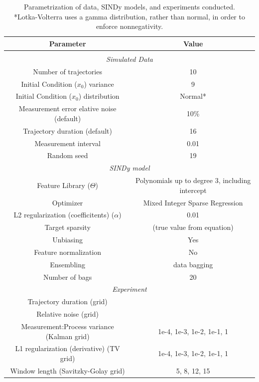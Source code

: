 \documentclass{ACCESS_latex_template_20231118/ieeeaccess}
\begin{document}
\begin{table}
    \label{tab:exp-params}
    \begin{tabular}{c c}
        Parameter & Value\\
        \hline \\
        \multicolumn{2}{c}{\it Simulated Data} \\
        Number of trajectories & 10\\
        Initial Condition ($x_0$) variance & 9\\
        Initial Condition ($x_0$) distribution & Normal*\\
        Measurement error elative noise (default) & 10\% \\
        Trajectory duration (default) & 16 \\
        Measurement interval & 0.01\\
        Random seed & 19 \\
        \multicolumn{2}{c}{\it SINDy model} \\
        Feature Library ($\Theta$) & Polynomials up to degree 3, including intercept \\
        Optimizer & Mixed Integer Sparse Regression \\
        L2 regularization (coefficitents) ($\alpha$) & 0.01 \\
        Target sparsity & (true value from equation) \\
        Unbiasing & Yes \\
        Feature normalization & No \\
        Ensembling & data bagging \\
        Number of bags & 20 \\
        \multicolumn{2}{c}{\it Experiment} \\
        Trajectory duration (grid) & \\
        Relative noise (grid) & \\
        Measurement:Process variance (Kalman grid) & 1e-4, 1e-3, 1e-2, 1e-1, 1 \\
        L1 regularization (derivative) (TV grid) & 1e-4, 1e-3, 1e-2, 1e-1, 1 \\
        Window length (Savitzky-Golay grid) & 5, 8, 12, 15\\
        \hline
    \end{tabular}
    \caption{Parametrization of data, SINDy models, and experiments conducted.\\
    *Lotka-Volterra uses a gamma distribution, rather than normal, in order to enforce nonnegativity.}
\end{table}



\end{document}
